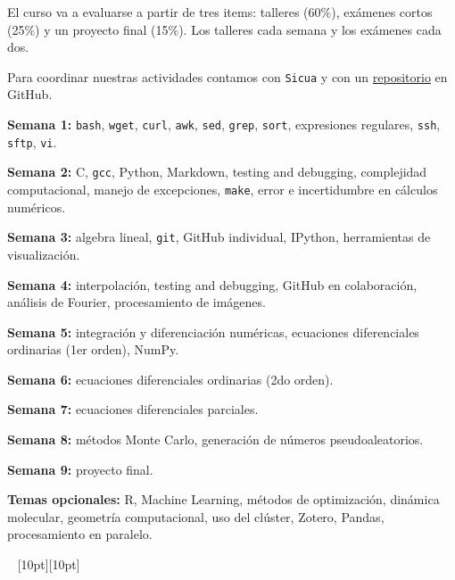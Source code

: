 \documentclass[letterpaper,10pt,onecolumn]{article}
\begin{document}
\vspace{0.3cm}
\noindent El curso va a evaluarse a partir de tres items: talleres (60\%), exámenes cortos (25\%) y un proyecto final (15\%). Los talleres cada semana y los exámenes cada dos.

\noindent Para coordinar nuestras actividades contamos con \verb+Sicua+ y con un \href{https://github.com/ComputoCienciasUniandes/MetodosComputacionales}{repositorio} en GitHub.


\vspace{0.5cm}

\noindent\textbf{Semana 1:} \verb+bash+, \verb+wget+, \verb+curl+, \verb+awk+, \verb+sed+, \verb+grep+, \verb+sort+, expresiones regulares, \verb+ssh+, \verb+sftp+, \verb+vi+.

\noindent\textbf{Semana 2:} C, \verb+gcc+, Python, Markdown, testing and debugging, complejidad computacional, manejo de excepciones, \verb+make+, error e incertidumbre en cálculos numéricos.

\noindent\textbf{Semana 3:} algebra lineal, \verb+git+, GitHub individual, IPython, herramientas de visualización.

\noindent\textbf{Semana 4:} interpolación, testing and debugging, GitHub en colaboración, análisis de Fourier, procesamiento de imágenes.

\noindent\textbf{Semana 5:} integración y diferenciación numéricas, ecuaciones diferenciales ordinarias (1er orden), NumPy.

\noindent\textbf{Semana 6:} ecuaciones diferenciales ordinarias (2do orden).

\noindent\textbf{Semana 7:} ecuaciones diferenciales parciales.

\noindent\textbf{Semana 8:} métodos Monte Carlo, generación de números pseudoaleatorios.

\noindent\textbf{Semana 9:} proyecto final.

\vspace{0.1cm}
\noindent\textbf{Temas opcionales:} R, Machine Learning, métodos de optimización, dinámica molecular, geometría computacional, uso del clúster, Zotero, Pandas, procesamiento en paralelo.

\vspace{0.2cm}
\noindent \hrulefill~ \raisebox{-1pt}[10pt][10pt]{\leafleft}~ \hrulefill
\end{document}
